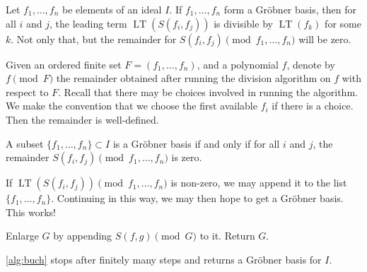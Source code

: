 \documentclass[11pt]{article}
\DeclareMathOperator{\LT}{LT}
\begin{document}
Let $f_1, \dots, f_n$ be elements of an ideal $I$.
If $f_1, \dots, f_n$ form a Gr\"obner basis, then for all $i$ and $j$, the leading term $\LT(S(f_i,f_j))$ is divisible by $\LT(f_k)$ for some $k$.
Not only that, but the remainder for $S(f_i,f_j) \pmod {f_1, \dots, f_n}$ will be zero.

Given an ordered finite set $F = (f_1, \dots, f_n)$, and a polynomial $f$, denote by $f \pmod F$ the remainder obtained after running the division algorithm on $f$ with respect to $F$.
Recall that there may be choices involved in running the algorithm.
We make the convention that we choose the first available $f_i$ if there is a choice.
Then the remainder is well-defined.
\begin{proposition}
  A subset $\{f_1, \dots, f_n\} \subset I$ is a Gr\"obner basis if and only if for all $i$ and $j$, the remainder $S(f_i,f_j) \pmod {f_1, \dots, f_n}$ is zero.
\end{proposition}
If $\LT(S(f_i,f_j)) \pmod {f_1,\dots, f_n}$ is non-zero, we may append it to the list $\{f_1, \dots, f_n\}$.
Continuing in this way, we may then hope to get a Gr\"obner basis.
This works!

\begin{algorithm}
  {
    Enlarge $G$ by appending $S(f,g) \pmod G$ to it.
  }
  Return $G$.
  \bigskip

  \caption{Buchberger's algorithm to construct a Gr\"obner basis}
  \label{alg:buch}
\end{algorithm}

\begin{proposition}
  \autoref{alg:buch} stops after finitely many steps and returns a Gr\"obner basis for $I$.
\end{proposition}



\end{document}
